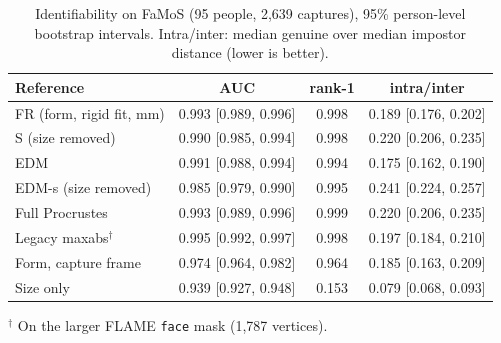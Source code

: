 \begin{table}[!ht]
\centering
\small
\caption{Identifiability on FaMoS (95 people, 2{,}639 captures), 95\%
person-level bootstrap intervals. Intra/inter: median genuine over median
impostor distance (lower is better).}
\label{tab:gt_arbiter}
\begin{tabular}{lccc}
\toprule
Reference & AUC & rank-1 & intra/inter \\
\midrule
FR (form, rigid fit, mm) & 0.993 [0.989, 0.996] & 0.998 & 0.189 [0.176, 0.202] \\
S (size removed)         & 0.990 [0.985, 0.994] & 0.998 & 0.220 [0.206, 0.235] \\
EDM                      & 0.991 [0.988, 0.994] & 0.994 & 0.175 [0.162, 0.190] \\
EDM-s (size removed)     & 0.985 [0.979, 0.990] & 0.995 & 0.241 [0.224, 0.257] \\
\midrule
Full Procrustes          & 0.993 [0.989, 0.996] & 0.999 & 0.220 [0.206, 0.235] \\
Legacy maxabs$^\dagger$  & 0.995 [0.992, 0.997] & 0.998 & 0.197 [0.184, 0.210] \\
Form, capture frame      & 0.974 [0.964, 0.982] & 0.964 & 0.185 [0.163, 0.209] \\
Size only                & 0.939 [0.927, 0.948] & 0.153 & 0.079 [0.068, 0.093] \\
\bottomrule
\end{tabular}

\vspace{0.3em}
\footnotesize{$^\dagger$ On the larger FLAME \texttt{face} mask (1{,}787 vertices).}
\end{table}

